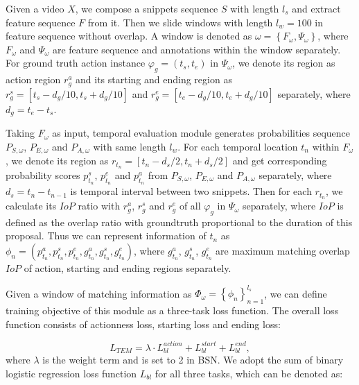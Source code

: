 \documentclass[runningheads]{llncs}
\begin{document}
Given a video $X$, we compose a snippets sequence $S$ with length $l_s$ and extract feature sequence $F$ from it.
Then we slide windows with length $l_w=100$ in feature sequence without overlap.
A window is denoted as $\omega =\left \{ F_{\omega}, \Psi_{\omega} \right \}$, where $F_{\omega}$ and $\Psi_{\omega}$ are feature sequence and annotations within the window separately.
 For ground truth action instance $\varphi_g=( t_{s},t_{e} )$ in  $\Psi_{\omega}$, we denote its region as action region $r_{g}^a$ and its starting and ending region as $r_g^s=[ t_s-d_g/10,t_s+d_g/10 ]$ and $r_g^e= [ t_e-d_g/10,t_e+d_g/10 ]$ separately, where $d_g=t_e-t_s$.

Taking $F_{\omega}$ as input, temporal evaluation module generates probabilities sequence $P_{S,\omega}$, $P_{E,\omega}$ and $P_{A,\omega}$ with same length $l_w$.
For each temporal location $t_n$ within $F_{\omega}$, we denote its region as $r _{t_n}=[ t_n-d_s/2,t_n+d_s/2 ]$ and get corresponding probability scores $p^s_{t_n}$, $p^e_{t_n}$ and $p^a_{t_n}$ from $P_{S,\omega}$, $P_{E,\omega}$ and $P_{A,\omega}$ separately, where $d_s=t_{n}-t_{n-1}$ is temporal interval between two snippets.
Then for each  $r_{t_n}$, we calculate its $IoP$ ratio with $r_{g}^a$, $r_g^s$ and $r_g^e$ of all $\varphi_g$ in $\Psi_{\omega}$ separately, where $IoP$ is defined as the overlap ratio with groundtruth proportional to the duration of this proposal. Thus we can represent information of $t_n$ as $\phi_{n}=(p^a_{t_n},p^s_{t_n},p^e_{t_n},g^{a}_{t_n},g^{s}_{t_n},g^{e}_{t_n})$, where $g^{a}_{t_n}$, $g^{s}_{t_n}$, $g^{e}_{t_n}$ are maximum matching overlap $IoP$ of action, starting and ending regions separately.

Given a window of matching information as $\Phi_{\omega}=\left \{ \phi_n \right \}_{n=1}^{l_s}$, we can define training objective of this module as a three-task loss function. The overall loss function consists of actionness loss, starting loss and ending loss:


\begin{equation}
L_{TEM}=\lambda \cdot L_{bl}^{action}+L_{bl}^{start}+L_{bl}^{end} ,
\end{equation}
where $\lambda$ is the weight term and is set to 2 in BSN. We adopt the sum of binary logistic regression loss function $L_{bl}$ for all three tasks, which can be denoted as:
\end{document}
